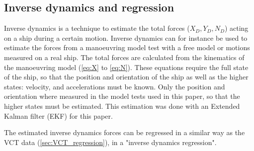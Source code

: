 \subsection{Inverse dynamics and regression}
\label{sec:inverse_dynamics}
Inverse dynamics is a technique to estimate the total forces ($X_D,Y_D,N_D$) acting on a ship during a certain motion. Inverse dynamics can for instance be used to estimate the forces from a manoeuvring model test with a free model or motions measured on a real ship. The total forces are calculated from the kinematics of the manoeuvring model (\autoref{eq:X} to \autoref{eq:N}). These equations require the full state of the ship, so that the position and orientation of the ship as well as the higher states: velocity, and accelerations must be known. 
Only the position and orientation where measured in the model tests used in this paper, so that the higher states must be estimated. This estimation was done with an Extended Kalman filter (EKF) for this paper.

The estimated inverse dynamics forces can be regressed in a similar way as the VCT data (\autoref{sec:VCT_regression}), in a "inverse dynamics regression".  